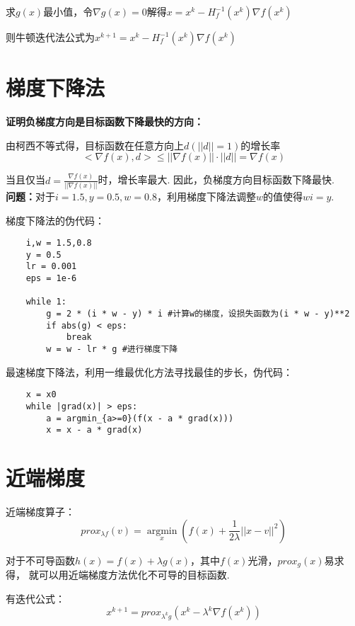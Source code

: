 \documentclass{article}
\begin{document}
求$g(x)$最小值，令$\nabla g(x)=0$解得$x=x^k-H^{-1}_f(x^k)\nabla f(x^k)$

则牛顿迭代法公式为$x^{k+1}=x^k-H^{-1}_f(x^k)\nabla f(x^k)$

\section{梯度下降法}
\textbf{证明负梯度方向是目标函数下降最快的方向：}


由柯西不等式得，目标函数在任意方向上$d(||d||=1)$的增长率
\begin{equation*}
    <\nabla f(x),d>\leq ||\nabla f(x)||\cdot ||d||=\nabla f(x)
\end{equation*}

当且仅当$d=\frac{\nabla f(x)}{||\nabla f(x)||}$时，增长率最大.
因此，负梯度方向目标函数下降最快.\\

\textbf{问题：}对于$i=1.5,y=0.5,w=0.8$，利用梯度下降法调整$w$的值使得$wi=y$.

梯度下降法的伪代码：
\begin{verbatim}
    i,w = 1.5,0.8
    y = 0.5
    lr = 0.001
    eps = 1e-6

    while 1:
        g = 2 * (i * w - y) * i #计算w的梯度，设损失函数为(i * w - y)**2
        if abs(g) < eps:
            break
        w = w - lr * g #进行梯度下降
\end{verbatim}

最速梯度下降法，利用一维最优化方法寻找最佳的步长，伪代码：
\begin{verbatim}
    x = x0
    while |grad(x)| > eps:
        a = argmin_{a>=0}(f(x - a * grad(x)))
        x = x - a * grad(x)
\end{verbatim}

\section{近端梯度}
近端梯度算子：
\begin{equation*}
    prox_{\lambda f}(v)=\mathop{argmin}\limits_{x}(f(x)+\frac{1}{2\lambda}||x-v||^2)
\end{equation*}

对于不可导函数$h(x)=f(x)+\lambda g(x)$，其中$f(x)$光滑，$prox_g(x)$易求得，
就可以用近端梯度方法优化不可导的目标函数.

有迭代公式：
\begin{equation*}
    x^{k+1}=prox_{\lambda^kg}(x^k-\lambda^k\nabla f(x^k))
\end{equation*}
\end{document}
